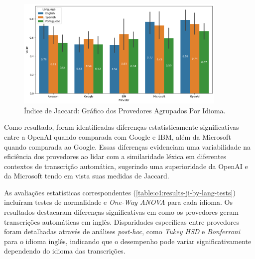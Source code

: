 \begin{figure}[htb]
\centering
\caption{Índice de Jaccard: Gráfico dos Provedores Agrupados Por Idioma.}
\label{fig:chapter4-cs1-lexical-by-lang-barplot}
\includegraphics[width=0.9\textwidth]{images/chapter4-cs1-lexical-by-lang-barplot.png}
\end{figure}

Como resultado, foram identificadas diferenças estatisticamente significativas entre a OpenAI quando comparada com Google e IBM, além da Microsoft quando comparada ao Google. Essas diferenças evidenciam uma variabilidade na eficiência dos provedores ao lidar com a similaridade léxica em diferentes contextos de transcrição automática, sugerindo uma superioridade da OpenAI e da Microsoft tendo em vista suas medidas de Jaccard.

As avaliações estatísticas correspondentes (\autoref{table:c4:results-ji-by-lang-tests}) incluíram testes de normalidade e \textit{One-Way ANOVA} para cada idioma. Os resultados destacaram diferenças significativas em como os provedores geram transcrições automáticas em inglês. Disparidades específicas entre provedores foram detalhadas através de análises \textit{post-hoc}, como \textit{Tukey HSD} e \textit{Bonferroni} para o idioma inglês, indicando que o desempenho pode variar significativamente dependendo do idioma das transcrições.

